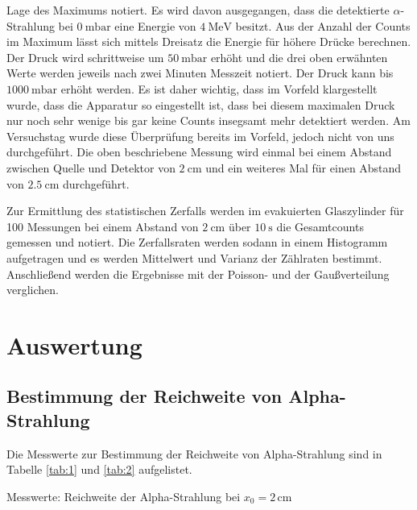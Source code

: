 Lage des Maximums notiert. Es wird davon ausgegangen, dass die detektierte $\alpha$-Strahlung bei $\SI{0}{\milli \bar}$ eine Energie
von $\SI{4}{\mega \eV}$ besitzt. Aus der Anzahl der Counts im Maximum lässt sich mittels Dreisatz die Energie für höhere Drücke
berechnen. Der Druck wird schrittweise um $\SI{50}{\milli \bar}$ erhöht und die drei oben erwähnten Werte werden jeweils nach zwei Minuten Messzeit
notiert. Der Druck kann bis $\SI{1000}{\milli \bar}$ erhöht werden. Es ist daher wichtig, dass im Vorfeld klargestellt wurde, dass die Apparatur
so eingestellt ist, dass bei diesem maximalen Druck nur noch sehr wenige bis gar keine Counts insegsamt mehr detektiert werden.
Am Versuchstag wurde diese Überprüfung bereits im Vorfeld, jedoch nicht von uns durchgeführt.
Die oben beschriebene Messung wird einmal bei einem Abstand zwischen Quelle und Detektor von $\SI{2}{\cm}$ und ein weiteres Mal für einen Abstand
von $\SI{2,5}{\cm}$ durchgeführt.

\noindent Zur Ermittlung des statistischen Zerfalls werden im evakuierten Glaszylinder für 100 Messungen bei einem Abstand von $\SI{2}{\cm}$
über $\SI{10}{\second}$ die Gesamtcounts gemessen und notiert. Die Zerfallsraten werden sodann in einem Histogramm aufgetragen und es werden
Mittelwert und Varianz der Zählraten bestimmt. Anschließend werden die Ergebnisse mit der Poisson- und der Gaußverteilung verglichen.

\section{Auswertung}
\subsection{Bestimmung der Reichweite von Alpha-Strahlung}
Die Messwerte zur Bestimmung der Reichweite von Alpha-Strahlung sind in Tabelle \ref{tab:1} und \ref{tab:2} aufgelistet.

\begin{table}
  \centering
  \caption{Messwerte: Reichweite der Alpha-Strahlung bei $x_0=2 \, \mathrm{cm}$}
  \label{tab:1}

\end{table}
